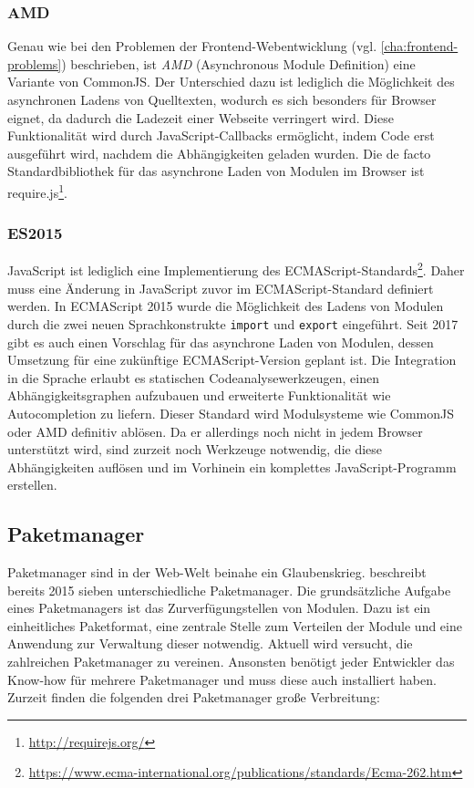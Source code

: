 \subsubsection{AMD}
\label{sub:amd}
Genau wie bei den Problemen der Frontend-Webentwicklung (vgl. \cref{cha:frontend-problems}) beschrieben, ist \emph{AMD} (Asynchronous Module Definition) eine Variante von CommonJS.
Der Unterschied dazu ist lediglich die Möglichkeit des asynchronen Ladens von Quelltexten, wodurch es sich besonders für Browser eignet, da dadurch die Ladezeit einer Webseite verringert wird.
Diese Funktionalität wird durch JavaScript-Callbacks ermöglicht, indem Code erst ausgeführt wird, nachdem die Abhängigkeiten geladen wurden.
Die de facto Standardbibliothek für das asynchrone Laden von Modulen im Browser ist require.js\footnote{\url{http://requirejs.org/}}.

\subsubsection{ES2015}
\label{sub:es2015}
JavaScript ist lediglich eine Implementierung des ECMAScript-Standards\footnote{\url{https://www.ecma-international.org/publications/standards/Ecma-262.htm}}.
Daher muss eine Änderung in JavaScript zuvor im ECMAScript-Standard definiert werden.
In ECMAScript 2015 wurde die Möglichkeit des Ladens von Modulen durch die zwei neuen Sprachkonstrukte \verb|import| und \verb|export| eingeführt.
Seit 2017 gibt es auch einen Vorschlag für das asynchrone Laden von Modulen, dessen Umsetzung für eine zukünftige ECMAScript-Version geplant ist.
Die Integration in die Sprache erlaubt es statischen Codeanalysewerkzeugen, einen Abhängigkeitsgraphen aufzubauen und erweiterte Funktionalität wie Autocompletion zu liefern.
Dieser Standard wird Modulsysteme wie CommonJS oder AMD definitiv ablösen.
Da er allerdings noch nicht in jedem Browser unterstützt wird, sind zurzeit noch Werkzeuge notwendig, die diese Abhängigkeiten auflösen und im Vorhinein ein komplettes JavaScript-Programm erstellen.


\subsection{Paketmanager}
\label{sub:package-managers}
Paketmanager sind in der Web-Welt beinahe ein Glaubenskrieg.
\autocite{Farmer.package-managers:online} beschreibt bereits 2015 sieben unterschiedliche Paketmanager.
Die grundsätzliche Aufgabe eines Paketmanagers ist das Zurverfügungstellen von Modulen.
Dazu ist ein einheitliches Paketformat, eine zentrale Stelle zum Verteilen der Module und eine Anwendung zur Verwaltung dieser notwendig.
Aktuell wird versucht, die zahlreichen Paketmanager zu vereinen.
Ansonsten benötigt jeder Entwickler das Know-how für mehrere Paketmanager und muss diese auch installiert haben.
Zurzeit finden die folgenden drei Paketmanager große Verbreitung:

